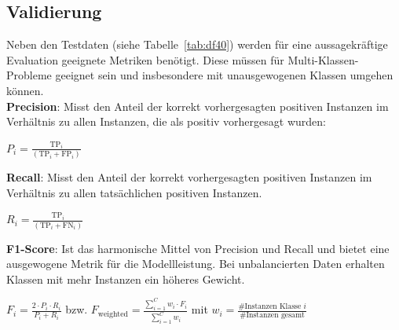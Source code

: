 \documentclass{article}
\begin{document}
\subsection{Validierung}\label{ssec:validation}
Neben den Testdaten (siehe Tabelle~\ref{tab:df40}) werden für eine aussagekräftige Evaluation geeignete Metriken benötigt.
Diese müssen für Multi-Klassen-Probleme geeignet sein und insbesondere mit unausgewogenen Klassen umgehen können.
\\[0.5em]
\textbf{Precision}: Misst den Anteil der korrekt vorhergesagten positiven Instanzen im Verhältnis zu allen Instanzen, die als positiv vorhergesagt wurden:
    \begin{center}
        $\displaystyle P_i=\frac{\text{TP}_i}{(\text{TP}_i+\text{FP}_i)}$ %
    \end{center}
\textbf{Recall}: Misst den Anteil der korrekt vorhergesagten positiven Instanzen im Verhältnis zu allen tatsächlichen positiven Instanzen.
    \begin{center}
        $\displaystyle R_i=\frac{\text{TP}_i}{(\text{TP}_i+\text{FN}_i)}$ %
    \end{center}
\textbf{F1-Score}: Ist das harmonische Mittel von Precision und Recall und bietet eine ausgewogene Metrik für die Modellleistung. Bei unbalancierten Daten erhalten Klassen mit mehr Instanzen ein höheres Gewicht.
    \begin{center}
        $\displaystyle F_i=\frac{2\cdot P_i\cdot R_i}{P_i+R_i}$ bzw. $\displaystyle F_\text{weighted}=\frac{\sum_{i=1}^Cw_i\cdot F_i}{\sum_{i=1}^Cw_i}$ mit $w_i=\frac{\text{\#Instanzen Klasse }i}{\text{\#Instanzen gesamt}}$
    \end{center}
\end{document}
